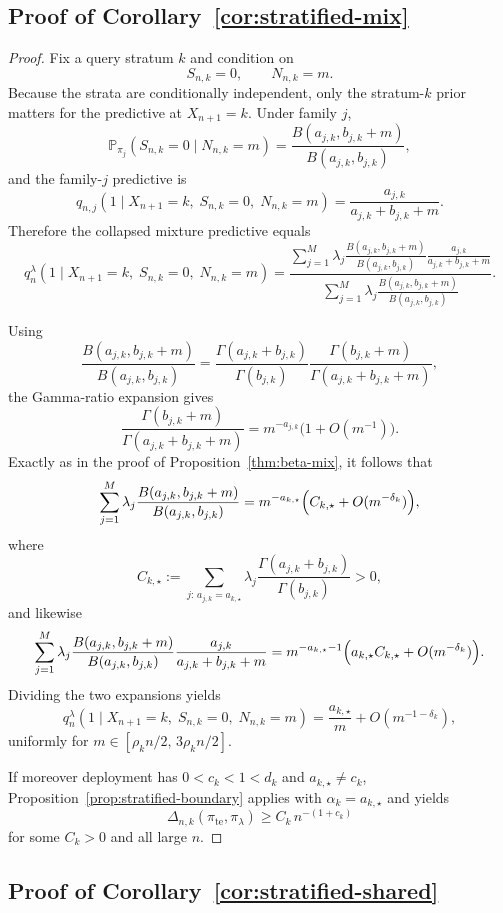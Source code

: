 \documentclass{article}
\theoremstyle{definition}
\theoremstyle{remark}
\newcommand{\Pbb}{\mathbb{P}}
\newcommand{\te}{\mathrm{te}}
\begin{document}
\subsection{Proof of Corollary~\ref{cor:stratified-mix}}

\begin{proof}
Fix a query stratum $k$ and condition on
\[
S_{n,k}=0,
\qquad
N_{n,k}=m.
\]
Because the strata are conditionally independent, only the stratum-$k$ prior matters for the predictive at $X_{n+1}=k$. Under family $j$,
\[
\Pbb_{\pi_j}(S_{n,k}=0\mid N_{n,k}=m)
=
\frac{B(a_{j,k},b_{j,k}+m)}{B(a_{j,k},b_{j,k})},
\]
and the family-$j$ predictive is
\[
q_{n,j}(1\mid X_{n+1}=k,\;S_{n,k}=0,\;N_{n,k}=m)
=
\frac{a_{j,k}}{a_{j,k}+b_{j,k}+m}.
\]
Therefore the collapsed mixture predictive equals
\[
q_n^\lambda(1\mid X_{n+1}=k,\;S_{n,k}=0,\;N_{n,k}=m)
=
\frac{
\sum_{j=1}^M
\lambda_j
\frac{B(a_{j,k},b_{j,k}+m)}{B(a_{j,k},b_{j,k})}
\frac{a_{j,k}}{a_{j,k}+b_{j,k}+m}
}{
\sum_{j=1}^M
\lambda_j
\frac{B(a_{j,k},b_{j,k}+m)}{B(a_{j,k},b_{j,k})}
}.
\]

Using
\[
\frac{B(a_{j,k},b_{j,k}+m)}{B(a_{j,k},b_{j,k})}
=
\frac{\Gamma(a_{j,k}+b_{j,k})}{\Gamma(b_{j,k})}
\frac{\Gamma(b_{j,k}+m)}{\Gamma(a_{j,k}+b_{j,k}+m)},
\]
the Gamma-ratio expansion gives
\[
\frac{\Gamma(b_{j,k}+m)}{\Gamma(a_{j,k}+b_{j,k}+m)}
=
m^{-a_{j,k}}\bigl(1+O(m^{-1})\bigr).
\]
Exactly as in the proof of Proposition~\ref{thm:beta-mix}, it follows that
\[
\sum_{j=1}^M
\lambda_j
\frac{B(a_{j,k},b_{j,k}+m)}{B(a_{j,k},b_{j,k})}
=
m^{-a_{k,\star}}
\Bigl(
C_{k,\star}+O(m^{-\delta_k})
\Bigr),
\]
where
\[
C_{k,\star}
:=
\sum_{j:\,a_{j,k}=a_{k,\star}}
\lambda_j
\frac{\Gamma(a_{j,k}+b_{j,k})}{\Gamma(b_{j,k})}
>0,
\]
and likewise
\[
\sum_{j=1}^M
\lambda_j
\frac{B(a_{j,k},b_{j,k}+m)}{B(a_{j,k},b_{j,k})}
\frac{a_{j,k}}{a_{j,k}+b_{j,k}+m}
=
m^{-a_{k,\star}-1}
\Bigl(
a_{k,\star}C_{k,\star}+O(m^{-\delta_k})
\Bigr).
\]
Dividing the two expansions yields
\[
q_n^\lambda(1\mid X_{n+1}=k,\;S_{n,k}=0,\;N_{n,k}=m)
=
\frac{a_{k,\star}}{m}+O(m^{-1-\delta_k}),
\]
uniformly for $m\in[\rho_k n/2,\,3\rho_k n/2]$.

If moreover deployment has $0<c_k<1<d_k$ and $a_{k,\star}\neq c_k$, Proposition~\ref{prop:stratified-boundary} applies with $\alpha_k=a_{k,\star}$ and yields
\[
\Delta_{n,k}(\pi_{\te},\pi_\lambda)\ge C_k\,n^{-(1+c_k)}
\]
for some $C_k>0$ and all large $n$.
\end{proof}

\subsection{Proof of Corollary~\ref{cor:stratified-shared}}
\end{document}
